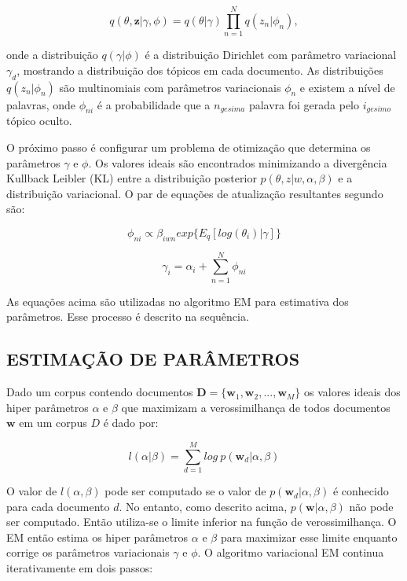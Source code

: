 \documentclass[12pt,a4paper]{article}
\begin{document}
\begin{equation}
q(\theta,\textbf{z}|\gamma,\phi)=q(\theta|\gamma)\prod_{n=1}^{N}q(z_n|\phi_n), 
\end{equation}

onde a distribuição  $q(\gamma|\phi)$ é a distribuição Dirichlet com parâmetro variacional $\gamma_d$, mostrando a distribuição dos tópicos em cada documento.
 As distribuições $q(z_n | \phi_n)$ são multinomiais com parâmetros variacionais $\phi_n$ e existem a nível de palavras, onde $\phi_{ni}$ é a probabilidade que a $n_{gesima}$ palavra foi gerada pelo $i_{gesimo}$ tópico oculto.

O próximo passo é configurar um problema de otimização que determina os parâmetros $\gamma$ e $\phi$. Os valores ideais são encontrados minimizando a divergência Kullback Leibler (KL) entre a distribuição posterior $p(\theta, z|w,\alpha,\beta)$ e a distribuição variacional.
 O par de equações de atualização resultantes segundo  são:

\begin{equation}
\phi_{ni} \propto \beta_{iwn} exp\{E_q[log(\theta_i)|\gamma]\}
\end{equation}

\begin{equation}
\gamma_i = \alpha_i + \sum_{n=1}^{N} \phi_{ni}
\end{equation}

As equações acima são utilizadas no algoritmo EM para estimativa dos parâmetros. Esse processo é descrito na sequência.

\subsection{ESTIMAÇÃO DE PARÂMETROS} \label{sec:estimacao-parametros}
Dado um corpus contendo documentos $\textbf{D} = \{\textbf{w}_1, \textbf{w}_2, . . ., \textbf{w}_M\}$ os valores ideais dos hiper parâmetros $\alpha$ e $\beta$
 que maximizam a verossimilhança de todos documentos $\textbf{w}$ em um corpus $D$ é dado por:

\begin{equation}
l(\alpha|\beta) = \sum_{d=1}^{M} log\ p(\textbf{w}_d|\alpha,\beta)
\end{equation}

O valor de $l(\alpha, \beta)$ pode ser computado se o valor de $p(\textbf{w}_d|\alpha, \beta)$ é conhecido para cada documento $d$. No entanto,
 como descrito acima, $p(\textbf{w}|\alpha,\beta)$ não pode ser computado. Então utiliza-se o limite inferior na função de verossimilhança.
 O EM então estima os hiper parâmetros $\alpha$ e $\beta$ para maximizar esse limite enquanto corrige os parâmetros variacionais $\gamma$ e $\phi$. 
 O algoritmo variacional EM continua iterativamente em dois passos:
\end{document}
